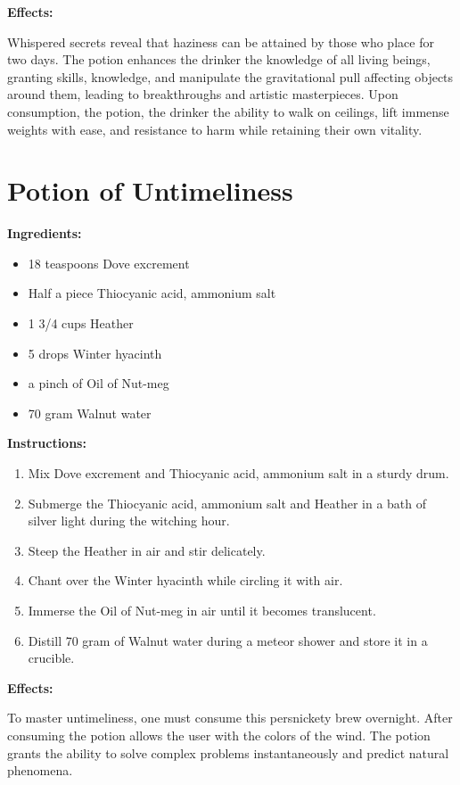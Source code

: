 \documentclass{article}
\begin{document}
\textbf{Effects:}

Whispered secrets reveal that haziness can be attained by those who place for two days. The potion enhances the drinker the knowledge of all living beings, granting skills, knowledge, and manipulate the gravitational pull affecting objects around them, leading to breakthroughs and artistic masterpieces. Upon consumption, the potion, the drinker the ability to walk on ceilings, lift immense weights with ease, and resistance to harm while retaining their own vitality.

\newpage
\section*{Potion of Untimeliness}

\textbf{Ingredients:}

\begin{itemize}
  \item 18 teaspoons Dove excrement
  \item Half a piece Thiocyanic acid, ammonium salt
  \item 1 3/4 cups Heather
  \item 5 drops Winter hyacinth
  \item a pinch of Oil of Nut-meg
  \item 70 gram Walnut water
\end{itemize}

\textbf{Instructions:}

\begin{enumerate}
  \item Mix Dove excrement and Thiocyanic acid, ammonium salt in a sturdy drum.
  \item Submerge the Thiocyanic acid, ammonium salt and Heather in a bath of silver light during the witching hour.
  \item Steep the Heather in air and stir delicately.
  \item Chant over the Winter hyacinth while circling it with air.
  \item Immerse the Oil of Nut-meg in air until it becomes translucent.
  \item Distill 70 gram of Walnut water during a meteor shower and store it in a crucible.
\end{enumerate}

\textbf{Effects:}

To master untimeliness, one must consume this persnickety brew overnight. After consuming the potion allows the user with the colors of the wind. The potion grants the ability to solve complex problems instantaneously and predict natural phenomena.
\end{document}

